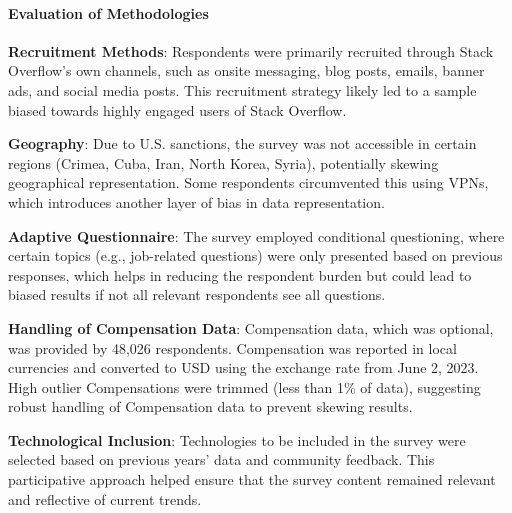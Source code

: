 \documentclass[
  12pt,
]{article}
\begin{document}
\hypertarget{evaluation-of-methodologies}{%
\paragraph{Evaluation of
Methodologies}\label{evaluation-of-methodologies}}

\newline
\newline

\textbf{Recruitment Methods}: Respondents were primarily recruited
through Stack Overflow's own channels, such as onsite messaging, blog
posts, emails, banner ads, and social media posts. This recruitment
strategy likely led to a sample biased towards highly engaged users of
Stack Overflow. \newline \newline

\textbf{Geography}: Due to U.S. sanctions, the survey was not accessible
in certain regions (Crimea, Cuba, Iran, North Korea, Syria), potentially
skewing geographical representation. Some respondents circumvented this
using VPNs, which introduces another layer of bias in data
representation. \newline \newline

\textbf{Adaptive Questionnaire}: The survey employed conditional
questioning, where certain topics (e.g., job-related questions) were
only presented based on previous responses, which helps in reducing the
respondent burden but could lead to biased results if not all relevant
respondents see all questions. \newline \newline

\textbf{Handling of Compensation Data}: Compensation data, which was
optional, was provided by 48,026 respondents. Compensation was reported
in local currencies and converted to USD using the exchange rate from
June 2, 2023. High outlier Compensations were trimmed (less than 1\% of
data), suggesting robust handling of Compensation data to prevent
skewing results. \newline \newline

\textbf{Technological Inclusion}: Technologies to be included in the
survey were selected based on previous years' data and community
feedback. This participative approach helped ensure that the survey
content remained relevant and reflective of current trends. \newline
\newline
\end{document}
